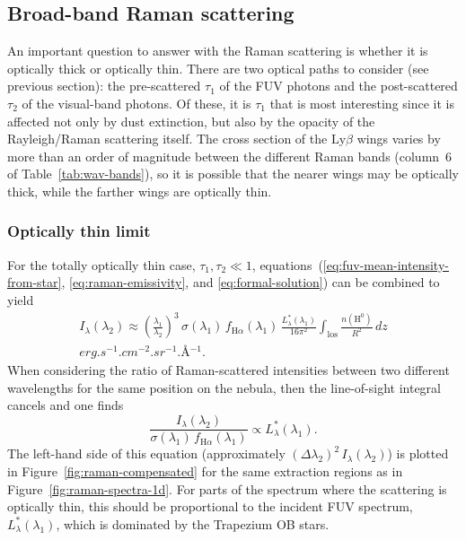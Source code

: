 \documentclass[useAMS, usenatbib, a4paper]{mnras}
\newcommand*\chem[1]{\ensuremath{\mathrm{#1}}}
\newcommand\ha{\ensuremath{\text{H}\alpha}}
\newcommand\lyb{\ensuremath{\text{Ly}\beta}}
\begin{document}
\subsection{Broad-band Raman scattering}
\label{sec:broad-band-raman}

An important question to answer with the Raman scattering is whether it is
optically thick or optically thin.
There are two optical paths to consider (see previous section):
the pre-scattered \(\tau_1\) of the FUV photons
and the post-scattered \(\tau_2\) of the visual-band photons.
Of these, it is \(\tau_1\) that is most interesting since it is affected
not only by dust extinction, but also by the opacity of the Rayleigh/Raman scattering itself.
The cross section of the \lyb{} wings varies by more than an order of magnitude
between the different Raman bands (column~6 of Table~\ref{tab:wav-bands}),
so it is possible that the nearer wings may be optically thick,
while the farther wings are optically thin. 

\subsubsection{Optically thin limit}
\label{sec:optically-thin-limit}

For the totally optically thin case, \(\tau_1, \tau_2 \ll 1\),
equations~(\ref{eq:fuv-mean-intensity-from-star},
\ref{eq:raman-emissivity},
and \ref{eq:formal-solution})
can be combined to yield
\begin{multline}
  \label{eq:optically-thin-intensity}
  I_\lambda (\lambda_2) \approx 
  \left(  \frac{\lambda_1}{\lambda_2}\right)^3 \, \sigma(\lambda_1) \, f_{\ha}(\lambda_1)
  \, \frac{L_\lambda^*(\lambda_1) } {16 \pi^2}
  \int_{\text{los}} \frac{n(\chem{H^0}) }{ R^2}  \, dz
  \\ \si{erg.s^{-1}.cm^{-2}.sr^{-1}.\angstrom^{-1}} .
\end{multline}
When considering the ratio of Raman-scattered intensities between two different wavelengths
for the same position on the nebula, then the line-of-sight integral cancels and one finds
\begin{equation}
  \label{eq:intensity-ratio-optically-thin}
  \frac{I_\lambda (\lambda_2)} {\sigma(\lambda_1) \, f_{\ha}(\lambda_1)} \propto L_\lambda^*(\lambda_1) .
\end{equation}
The left-hand side of this equation (approximately \((\Delta \lambda_2)^2\, I_\lambda (\lambda_2)\))
is plotted in Figure~\ref{fig:raman-compensated}
for the same extraction regions as in Figure~\ref{fig:raman-spectra-1d}. 
For parts of the spectrum where the scattering is optically thin,
this should be proportional to the incident FUV spectrum,
\(L_\lambda^*(\lambda_1)\),
which is dominated by the Trapezium OB stars. 
\end{document}
